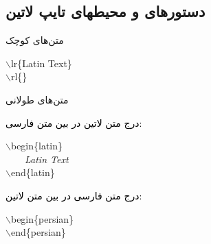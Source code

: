 \subsection[تایپ لاتین]{دستورهای و محیطهای تایپ لاتین}
\begin{plainslide}
\begin{block}{متن‌های کوچک}
\begin{latin}
{$\backslash$lr\{Latin Text\}\hfill\textcolor{black}{}}\\
{$\backslash$rl\{\}\hfill\textcolor{black}{}}\\
\end{latin}
\end{block}
\begin{block}{متن‌های طولانی}
\begin{minipage}{.45\textwidth}
\textcolor{black}{درج متن لاتین در بین متن فارسی:}\\
{
\begin{latin}
$\backslash$begin\{latin\}\\
$\qquad${\it Latin Text}\\
$\backslash$end\{latin\}
\end{latin}
}
\end{minipage}
\hspace{.05\textwidth}
\begin{minipage}{.45\textwidth}
\textcolor{black}{درج متن فارسی در بین متن لاتین:}\\
{
\begin{latin}
$\backslash$begin\{persian\}\\ $\qquad${\it{}}\\$\backslash$end\{persian\}
\end{latin}}
\end{minipage}
\end{block}
\end{plainslide}

